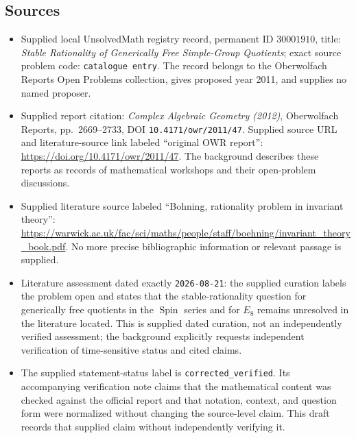 \documentclass[11pt]{article}
\begin{document}
\subsection{Sources}
\begin{itemize}
\item Supplied local UnsolvedMath registry record, permanent ID \(30001910\), title: \emph{Stable Rationality of Generically Free Simple-Group Quotients}; exact source problem code: \texttt{catalogue entry}. The record belongs to the Oberwolfach Reports Open Problems collection, gives proposed year 2011, and supplies no named proposer.
\item Supplied report citation: \emph{Complex Algebraic Geometry (2012)}, Oberwolfach Reports, pp.~2669--2733, DOI \texttt{10.4171/owr/2011/47}. Supplied source URL and literature-source link labeled ``original OWR report'': \url{https://doi.org/10.4171/owr/2011/47}. The background describes these reports as records of mathematical workshops and their open-problem discussions.
\item Supplied literature source labeled ``Bohning, rationality problem in invariant theory'': \url{https://warwick.ac.uk/fac/sci/maths/people/staff/boehning/invariant_theory_book.pdf}. No more precise bibliographic information or relevant passage is supplied.
\item Literature assessment dated exactly \texttt{2026-08-21}: the supplied curation labels the problem open and states that the stable-rationality question for generically free quotients in the \(\operatorname{Spin}\) series and for \(E_8\) remains unresolved in the literature located. This is supplied dated curation, not an independently verified assessment; the background explicitly requests independent verification of time-sensitive status and cited claims.
\item The supplied statement-status label is \texttt{corrected\_verified}. Its accompanying verification note claims that the mathematical content was checked against the official report and that notation, context, and question form were normalized without changing the source-level claim. This draft records that supplied claim without independently verifying it.
\end{itemize}
\end{document}
